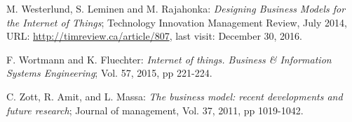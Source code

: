 \begin{thebibliography}{99}
	 M. Westerlund, S. Leminen and M. Rajahonka: \emph{Designing Business Models for the Internet of Things}; Technology Innovation Management Review, July 2014, URL: \url{http://timreview.ca/article/807}, last visit: December 30, 2016.

	 F. Wortmann and K. Fluechter: \emph{Internet of things. Business \& Information Systems Engineering}; Vol. 57, 2015, pp 221-224.

	 C. Zott, R. Amit, and L. Massa: \emph{The business model: recent developments and future research}; Journal of management, Vol. 37, 2011, pp 1019-1042. 
 \end{thebibliography}



